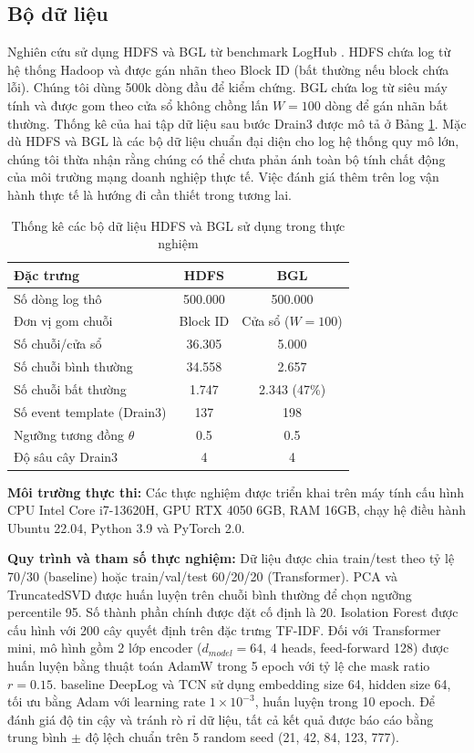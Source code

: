 \documentclass[conference]{IEEEtran}
\begin{document}
\subsection{Bộ dữ liệu}
Nghiên cứu sử dụng HDFS và BGL từ benchmark LogHub \cite{b6,b12}. HDFS chứa log từ hệ thống Hadoop và được gán nhãn theo Block ID (bất thường nếu block chứa lỗi). Chúng tôi dùng 500k dòng đầu để kiểm chứng. BGL chứa log từ siêu máy tính và được gom theo cửa sổ không chồng lấn $W{=}100$ dòng để gán nhãn bất thường. Thống kê của hai tập dữ liệu sau bước Drain3 được mô tả ở Bảng \ref{tab_dataset_stats}. Mặc dù HDFS và BGL là các bộ dữ liệu chuẩn đại diện cho log hệ thống quy mô lớn, chúng tôi thừa nhận rằng chúng có thể chưa phản ánh toàn bộ tính chất động của môi trường mạng doanh nghiệp thực tế. Việc đánh giá thêm trên log vận hành thực tế là hướng đi cần thiết trong tương lai.

\begin{table}[!t]
\caption{Thống kê các bộ dữ liệu HDFS và BGL sử dụng trong thực nghiệm}
\begin{center}
\scriptsize
\begin{tabular}{lcc}
\toprule
\textbf{Đặc trưng} & \textbf{HDFS} & \textbf{BGL} \\
\midrule
Số dòng log thô & 500.000 & 500.000 \\
Đơn vị gom chuỗi & Block ID & Cửa sổ ($W{=}100$) \\
Số chuỗi/cửa sổ & 36.305 & 5.000 \\
Số chuỗi bình thường & 34.558 & 2.657 \\
Số chuỗi bất thường & 1.747 & 2.343 (47\%) \\
Số event template (Drain3) & 137 & 198 \\
Ngưỡng tương đồng $\theta$ & 0.5 & 0.5 \\
Độ sâu cây Drain3 & 4 & 4 \\
\bottomrule
\end{tabular}
\label{tab_dataset_stats}
\end{center}
\end{table}

\textbf{Môi trường thực thi:} Các thực nghiệm được triển khai trên máy tính cấu hình CPU Intel Core i7-13620H, GPU RTX 4050 6GB, RAM 16GB, chạy hệ điều hành Ubuntu 22.04, Python 3.9 và PyTorch 2.0.

\textbf{Quy trình và tham số thực nghiệm:} Dữ liệu được chia train/test theo tỷ lệ 70/30 (baseline) hoặc train/val/test 60/20/20 (Transformer). PCA và TruncatedSVD được huấn luyện trên chuỗi bình thường để chọn ngưỡng percentile 95. Số thành phần chính được đặt cố định là 20. Isolation Forest được cấu hình với 200 cây quyết định trên đặc trưng TF-IDF. Đối với Transformer mini, mô hình gồm 2 lớp encoder ($d_{model}{=}64$, 4 heads, feed-forward 128) được huấn luyện bằng thuật toán AdamW trong 5 epoch với tỷ lệ che mask ratio $r{=}0.15$. baseline DeepLog và TCN sử dụng embedding size 64, hidden size 64, tối ưu bằng Adam với learning rate $1\times 10^{-3}$, huấn luyện trong 10 epoch. Để đánh giá độ tin cậy và tránh rò rỉ dữ liệu, tất cả kết quả được báo cáo bằng trung bình $\pm$ độ lệch chuẩn trên 5 random seed (21, 42, 84, 123, 777).
\end{document}
